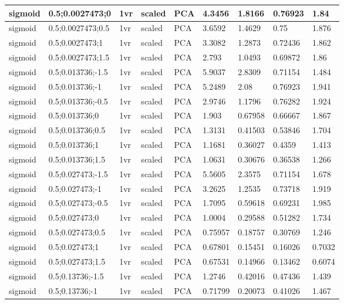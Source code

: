 \begin{longtable}{lllllllll}
sigmoid & 0.5;0.0027473;0 & 1vr & scaled & PCA & 4.3456 & 1.8166 & 0.76923 & 1.84\\ \hline
sigmoid & 0.5;0.0027473;0.5 & 1vr & scaled & PCA & 3.6592 & 1.4629 & 0.75 & 1.876\\ \hline
sigmoid & 0.5;0.0027473;1 & 1vr & scaled & PCA & 3.3082 & 1.2873 & 0.72436 & 1.862\\ \hline
sigmoid & 0.5;0.0027473;1.5 & 1vr & scaled & PCA & 2.793 & 1.0493 & 0.69872 & 1.86\\ \hline
sigmoid & 0.5;0.013736;-1.5 & 1vr & scaled & PCA & 5.9037 & 2.8309 & 0.71154 & 1.484\\ \hline
sigmoid & 0.5;0.013736;-1 & 1vr & scaled & PCA & 5.2489 & 2.08 & 0.76923 & 1.941\\ \hline
sigmoid & 0.5;0.013736;-0.5 & 1vr & scaled & PCA & 2.9746 & 1.1796 & 0.76282 & 1.924\\ \hline
sigmoid & 0.5;0.013736;0 & 1vr & scaled & PCA & 1.903 & 0.67958 & 0.66667 & 1.867\\ \hline
sigmoid & 0.5;0.013736;0.5 & 1vr & scaled & PCA & 1.3131 & 0.41503 & 0.53846 & 1.704\\ \hline
sigmoid & 0.5;0.013736;1 & 1vr & scaled & PCA & 1.1681 & 0.36027 & 0.4359 & 1.413\\ \hline
sigmoid & 0.5;0.013736;1.5 & 1vr & scaled & PCA & 1.0631 & 0.30676 & 0.36538 & 1.266\\ \hline
sigmoid & 0.5;0.027473;-1.5 & 1vr & scaled & PCA & 5.5605 & 2.3575 & 0.71154 & 1.678\\ \hline
sigmoid & 0.5;0.027473;-1 & 1vr & scaled & PCA & 3.2625 & 1.2535 & 0.73718 & 1.919\\ \hline
sigmoid & 0.5;0.027473;-0.5 & 1vr & scaled & PCA & 1.7095 & 0.59618 & 0.69231 & 1.985\\ \hline
sigmoid & 0.5;0.027473;0 & 1vr & scaled & PCA & 1.0004 & 0.29588 & 0.51282 & 1.734\\ \hline
sigmoid & 0.5;0.027473;0.5 & 1vr & scaled & PCA & 0.75957 & 0.18757 & 0.30769 & 1.246\\ \hline
sigmoid & 0.5;0.027473;1 & 1vr & scaled & PCA & 0.67801 & 0.15451 & 0.16026 & 0.7032\\ \hline
sigmoid & 0.5;0.027473;1.5 & 1vr & scaled & PCA & 0.67531 & 0.14966 & 0.13462 & 0.6074\\ \hline
sigmoid & 0.5;0.13736;-1.5 & 1vr & scaled & PCA & 1.2746 & 0.42016 & 0.47436 & 1.439\\ \hline
sigmoid & 0.5;0.13736;-1 & 1vr & scaled & PCA & 0.71799 & 0.20073 & 0.41026 & 1.467\\ \hline

\end{longtable}
